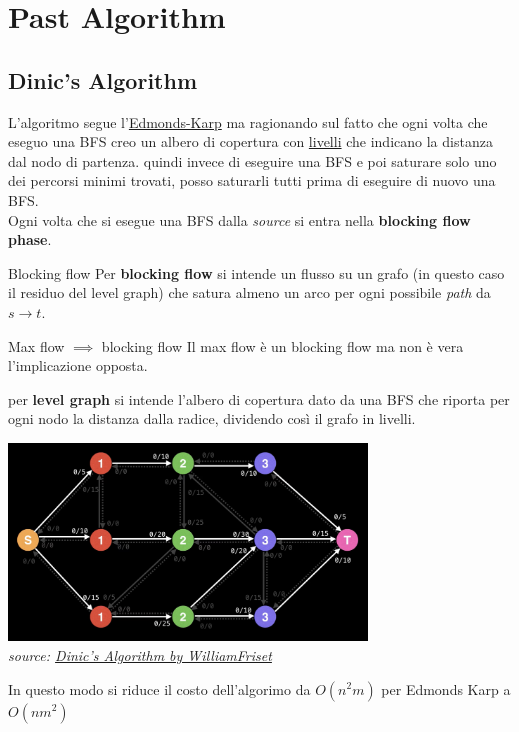 \documentclass[a4paper, 11pt]{report}
\begin{document}
\newpage

\chapter{Past Algorithm}
\section{Dinic's Algorithm}
\label{dnc}
L'algoritmo segue l'\href{https://en.wikipedia.org/wiki/Edmonds%E2%80%93Karp_algorithm}{Edmonds-Karp} ma ragionando sul fatto che ogni volta che eseguo una BFS creo un albero di copertura con \underline{livelli} che indicano la distanza dal nodo di partenza.
quindi invece di eseguire una BFS e poi saturare solo uno dei percorsi minimi trovati, posso saturarli tutti prima di eseguire di nuovo una BFS.\\
Ogni volta che si esegue una BFS dalla \textit{source} si entra nella \textbf{blocking flow phase}.\\
\begin{definition}{Blocking flow}{}
    Per \textbf{blocking flow} si intende un flusso su un grafo (in questo caso il residuo del level graph) che satura almeno un arco per ogni possibile \textit{path} da $s\rightarrow t$.    
\end{definition}
\begin{obs}{Max flow $\implies$ blocking flow}{}
    Il max flow è un blocking flow ma non è vera l'implicazione opposta.
\end{obs}
per \textbf{level graph} si intende l'albero di copertura dato da una BFS che riporta per ogni nodo la distanza dalla radice, dividendo così il grafo in livelli.
\begin{center}
    \includegraphics[height=5.25cm]{images/levelGraph.png}\\
    \textit{source: \href{https://www.youtube.com/watch?v=M6cm8UeeziI&t=2s}{Dinic's Algorithm by WilliamFriset}}
\end{center}
In questo modo si riduce il costo dell'algorimo da $O(n^2m)$ per Edmonds Karp a $O(nm^2)$
\end{document}
